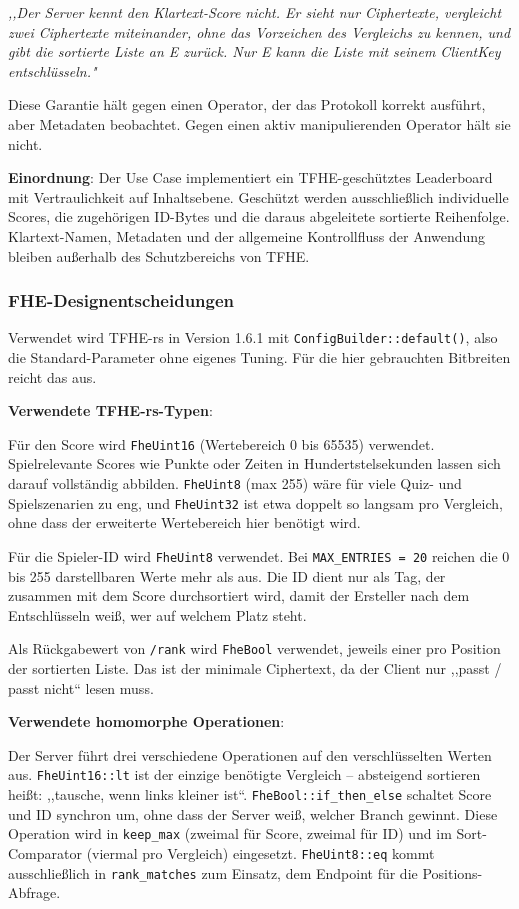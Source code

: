 \textit{,,Der Server kennt den Klartext-Score nicht. Er sieht nur Ciphertexte, vergleicht zwei Ciphertexte miteinander, ohne das Vorzeichen des Vergleichs zu kennen, und gibt die sortierte Liste an E zurück. Nur E kann die Liste mit seinem ClientKey entschlüsseln."}

Diese Garantie hält gegen einen Operator, der das Protokoll korrekt ausführt, aber Metadaten beobachtet. Gegen einen aktiv manipulierenden Operator hält sie nicht.

\textbf{Einordnung}:
Der Use Case implementiert ein TFHE-geschütztes Leaderboard mit Vertraulichkeit auf Inhaltsebene. Geschützt werden ausschließlich individuelle Scores, die zugehörigen ID-Bytes und die daraus abgeleitete sortierte Reihenfolge. Klartext-Namen, Metadaten und der allgemeine Kontrollfluss der Anwendung bleiben außerhalb des Schutzbereichs von TFHE.

\subsubsection{FHE-Designentscheidungen}

Verwendet wird TFHE-rs in Version 1.6.1 mit \texttt{ConfigBuilder::default()}, also die Standard-Parameter ohne eigenes Tuning. Für die hier gebrauchten Bitbreiten reicht das aus.

\textbf{Verwendete TFHE-rs-Typen}:

Für den Score wird \texttt{FheUint16} (Wertebereich 0 bis 65535) verwendet. Spielrelevante Scores wie Punkte oder Zeiten in Hundertstelsekunden lassen sich darauf vollständig abbilden. \texttt{FheUint8} (max 255) wäre für viele Quiz- und Spielszenarien zu eng, und \texttt{FheUint32} ist etwa doppelt so langsam pro Vergleich, ohne dass der erweiterte Wertebereich hier benötigt wird.

Für die Spieler-ID wird \texttt{FheUint8} verwendet. Bei \texttt{MAX\_ENTRIES = 20} reichen die 0 bis 255 darstellbaren Werte mehr als aus. Die ID dient nur als Tag, der zusammen mit dem Score durchsortiert wird, damit der Ersteller nach dem Entschlüsseln weiß, wer auf welchem Platz steht.

Als Rückgabewert von \texttt{/rank} wird \texttt{FheBool} verwendet, jeweils einer pro Position der sortierten Liste. Das ist der minimale Ciphertext, da der Client nur ,,passt / passt nicht`` lesen muss.

\textbf{Verwendete homomorphe Operationen}:

Der Server führt drei verschiedene Operationen auf den verschlüsselten Werten aus. \texttt{FheUint16::lt} ist der einzige benötigte Vergleich -- absteigend sortieren heißt: ,,tausche, wenn links kleiner ist``. \texttt{FheBool::if\_then\_else} schaltet Score und ID synchron um, ohne dass der Server weiß, welcher Branch gewinnt. Diese Operation wird in \texttt{keep\_max} (zweimal für Score, zweimal für ID) und im Sort-Comparator (viermal pro Vergleich) eingesetzt. \texttt{FheUint8::eq} kommt ausschließlich in \texttt{rank\_matches} zum Einsatz, dem Endpoint für die Positions-Abfrage.

